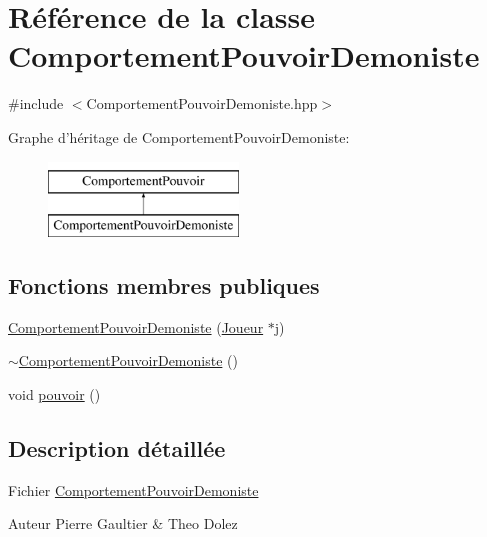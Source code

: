 \hypertarget{class_comportement_pouvoir_demoniste}{\section{\-Référence de la classe \-Comportement\-Pouvoir\-Demoniste}
\label{class_comportement_pouvoir_demoniste}
}


{\ttfamily \#include $<$\-Comportement\-Pouvoir\-Demoniste.\-hpp$>$}

\-Graphe d'héritage de \-Comportement\-Pouvoir\-Demoniste\-:\begin{figure}[H]
\begin{center}
\leavevmode
\includegraphics[height=2.000000cm]{class_comportement_pouvoir_demoniste}
\end{center}
\end{figure}
\subsection*{\-Fonctions membres publiques}
\begin{DoxyCompactItemize}
\item 
\hyperlink{class_comportement_pouvoir_demoniste_a1f6b2e5586c6c0e48cd2d88be22e730a}{\-Comportement\-Pouvoir\-Demoniste} (\hyperlink{class_joueur}{\-Joueur} $\ast$j)
\item 
\hyperlink{class_comportement_pouvoir_demoniste_a95cd36e0a6e6b10c9931ca1f4b9daad8}{$\sim$\-Comportement\-Pouvoir\-Demoniste} ()
\item 
void \hyperlink{class_comportement_pouvoir_demoniste_a85abc906021128b61ba1c292921c411d}{pouvoir} ()
\end{DoxyCompactItemize}


\subsection{\-Description détaillée}
\-Fichier \hyperlink{class_comportement_pouvoir_demoniste}{\-Comportement\-Pouvoir\-Demoniste} \begin{DoxyAuthor}{\-Auteur}
\-Pierre \-Gaultier \& \-Theo \-Dolez 
\end{DoxyAuthor}


